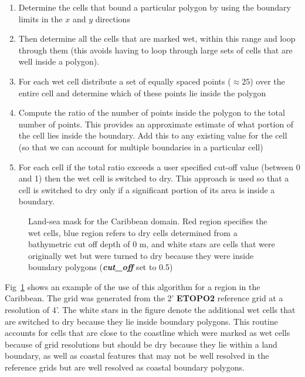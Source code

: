 \documentclass[12pt]{article}
\newcounter{myfigno}[section]
\newenvironment{myfig}[1]{\begin{figure}[#1]
                        \refstepcounter{myfigno}}
                       {\end{figure}}
\newcommand{\myfcap}[1]{\begin{list}{\ff Fig. \themyfigno\ :~\hfill}
                      {\rightmargin 8mm \labelsep 0mm
                       \labelwidth 8mm \leftmargin 8mm
                       \topsep 0mm \parskip 0mm \partopsep 0mm }
                       \item \ff #1 \end{list}}
\renewcommand{\themyfigno}{\thesection.\arabic{myfigno}}
\begin{document}
\renewcommand{\labelenumi}{Step~\theenumi:}
\begin{enumerate}
\item Determine the cells that bound a particular polygon by using the boundary limits in the $x$ and $y$ directions
\item Then determine all the cells that are marked wet, within this range and loop through them (this avoids having to loop through large sets of cells that are well inside a polygon).
\item For each wet cell distribute a set of equally spaced points ($\approx 25$) over the entire cell and determine which of these points lie inside the polygon
\item Compute the ratio of the number of points inside the polygon to the total number of points. This provides an approximate estimate of what portion of the cell lies inside the boundary. Add this to any existing value for the cell (so that we can account for multiple boundaries in a particular cell)
\item For each cell if the total ratio exceeds a user specified cut-off value (between 0 and 1) then the wet cell is switched to dry. This approach is used so that a cell is switched to dry only if a significant portion of its area is inside a boundary.
\end{enumerate} 

\begin{myfig}{tbp}
\centerline{}
\myfcap{Land-sea mask for the Caribbean domain. Red region specifies the wet cells, blue region refers to dry cells determined from a bathymetric cut off depth of 0 m, and white stars are cells that were originally wet but were turned to dry because they were inside boundary polygons (\textbf{\textit{cut\_off}} set to 0.5)}
\label{fig:land_mask}
\end{myfig}

Fig~\ref{fig:land_mask} shows an example of the use of this algorithm for a region in the Caribbean. The grid was generated from the 2' {\bf ETOPO2} reference grid at a resolution of 4'. The white stars in the figure denote the additional wet cells that are switched to dry because they lie inside boundary polygons. This routine accounts for cells that are close to the coastline which were marked as wet cells because of grid resolutions but should be dry because they lie within a land boundary, as well as coastal features that may not be well resolved in the reference grids but are well resolved as coastal boundary polygons. 
\end{document}
